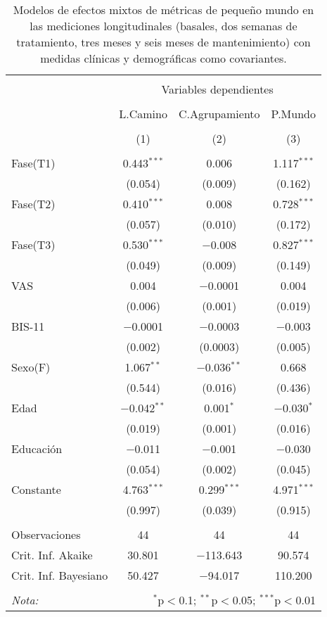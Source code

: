 \begin{table}[!htbp] \centering
    \small
  \caption{Modelos de efectos mixtos de métricas de pequeño mundo en las mediciones longitudinales (basales, dos semanas de tratamiento, tres meses y seis meses de mantenimiento) con medidas clínicas y demográficas como covariantes.}
  \label{tab:memL22}
\begin{tabular}{@{\extracolsep{5pt}}lccc}
\\[-1.8ex]\hline
\hline \\[-1.8ex]
 & \multicolumn{3}{c}{Variables dependientes} \\
\cline{2-4}
\\[-1.8ex] & L.Camino & C.Agrupamiento & P.Mundo \\
\\[-1.8ex] & (1) & (2) & (3)\\
\hline \\[-1.8ex]
 Fase(T1) & 0.443$^{***}$ & 0.006 & 1.117$^{***}$ \\
  & (0.054) & (0.009) & (0.162) \\
  Fase(T2) & 0.410$^{***}$ & 0.008 & 0.728$^{***}$ \\
  & (0.057) & (0.010) & (0.172) \\
  Fase(T3) & 0.530$^{***}$ & $-$0.008 & 0.827$^{***}$ \\
  & (0.049) & (0.009) & (0.149) \\
  VAS & 0.004 & $-$0.0001 & 0.004 \\
  & (0.006) & (0.001) & (0.019) \\
  BIS-11 & $-$0.0001 & $-$0.0003 & $-$0.003 \\
  & (0.002) & (0.0003) & (0.005) \\
  Sexo(F) & 1.067$^{**}$ & $-$0.036$^{**}$ & 0.668 \\
  & (0.544) & (0.016) & (0.436) \\
  Edad & $-$0.042$^{**}$ & 0.001$^{*}$ & $-$0.030$^{*}$ \\
  & (0.019) & (0.001) & (0.016) \\
  Educación & $-$0.011 & $-$0.001 & $-$0.030 \\
  & (0.054) & (0.002) & (0.045) \\
  Constante & 4.763$^{***}$ & 0.299$^{***}$ & 4.971$^{***}$ \\
  & (0.997) & (0.039) & (0.915) \\
 \hline \\[-1.8ex]
Observaciones & 44 & 44 & 44 \\
Crit. Inf. Akaike & 30.801 & $-$113.643 & 90.574 \\
Crit. Inf. Bayesiano & 50.427 & $-$94.017 & 110.200 \\
\hline
\hline \\[-1.8ex]
\textit{Nota:}  & \multicolumn{3}{r}{$^{*}$p$<$0.1; $^{**}$p$<$0.05; $^{***}$p$<$0.01} \\
\end{tabular}
\end{table}


